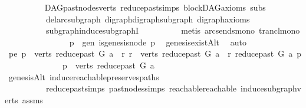 \begin{isabellebody}
\ \ \ \ \ \ \ \ \isamarkupfalse%
\ DAG{\isachardot}{\kern0pt}past{\isacharunderscore}{\kern0pt}nodes{\isacharunderscore}{\kern0pt}verts\ reduce{\isacharunderscore}{\kern0pt}past{\isachardot}{\kern0pt}simps\ blockDAG{\isacharunderscore}{\kern0pt}axioms\ subs\isanewline
\ \ \ \ \ \ \ \ \ \ del{\isacharunderscore}{\kern0pt}arc{\isacharunderscore}{\kern0pt}subgraph\ digraph{\isachardot}{\kern0pt}digraph{\isacharunderscore}{\kern0pt}subgraph\ digraph{\isacharunderscore}{\kern0pt}axioms\ \isanewline
\ \ \ \ \ \ \ \ \ \ subgraph{\isacharunderscore}{\kern0pt}induce{\isacharunderscore}{\kern0pt}subgraphI\isanewline
\ \ \ \ \ \ \ \ \isamarkupfalse%
\ {\isacharparenleft}{\kern0pt}metis\ arcs{\isacharunderscore}{\kern0pt}ends{\isacharunderscore}{\kern0pt}mono\ trancl{\isacharunderscore}{\kern0pt}mono{\isacharparenright}{\kern0pt}\isanewline
\ \ \ \ \isamarkupfalse%
\isanewline
\ \ \isamarkupfalse%
\ \ \isanewline
\ \ \ \ \isamarkupfalse%
\ p\ \ gen{\isacharcolon}{\kern0pt}\ {\isachardoublequoteopen}is{\isacharunderscore}{\kern0pt}genesis{\isacharunderscore}{\kern0pt}node\ p{\isachardoublequoteclose}\ \isamarkupfalse%
\ genesis{\isacharunderscore}{\kern0pt}existAlt\ \isamarkupfalse%
\ auto\isanewline
\ \ \ \ \isamarkupfalse%
\ pe{\isacharcolon}{\kern0pt}\ {\isachardoublequoteopen}p\ {\isasymin}\ verts\ {\isacharparenleft}{\kern0pt}reduce{\isacharunderscore}{\kern0pt}past\ G\ a{\isacharparenright}{\kern0pt}\ {\isasymand}\ {\isacharparenleft}{\kern0pt}{\isasymforall}r{\isachardot}{\kern0pt}\ r\ {\isasymin}\ verts\ {\isacharparenleft}{\kern0pt}reduce{\isacharunderscore}{\kern0pt}past\ G\ a{\isacharparenright}{\kern0pt}\ {\isasymlongrightarrow}\ r\ {\isasymrightarrow}\isactrlsup {\isacharasterisk}{\kern0pt}\isactrlbsub reduce{\isacharunderscore}{\kern0pt}past\ G\ a\isactrlesub \ p{\isacharparenright}{\kern0pt}{\isachardoublequoteclose}\isanewline
\ \ \ \ \isamarkupfalse%
\ \isanewline
\ \ \ \ \ \ \isamarkupfalse%
\ {\isachardoublequoteopen}p\ {\isasymin}\ verts\ {\isacharparenleft}{\kern0pt}reduce{\isacharunderscore}{\kern0pt}past\ G\ a{\isacharparenright}{\kern0pt}{\isachardoublequoteclose}\ \isamarkupfalse%
\ genesisAlt\ induce{\isacharunderscore}{\kern0pt}reachable{\isacharunderscore}{\kern0pt}preserves{\isacharunderscore}{\kern0pt}paths\isanewline
\ \ \ \ \ \ \ \ \ \ reduce{\isacharunderscore}{\kern0pt}past{\isachardot}{\kern0pt}simps\ past{\isacharunderscore}{\kern0pt}nodes{\isachardot}{\kern0pt}simps\ reachable{}{\isacharunderscore}{\kern0pt}reachable\ induce{\isacharunderscore}{\kern0pt}subgraph{\isacharunderscore}{\kern0pt}verts\ assms{\isacharparenleft}{\kern0pt}{}{\isacharparenright}{\kern0pt}\isanewline

\end{isabellebody}
